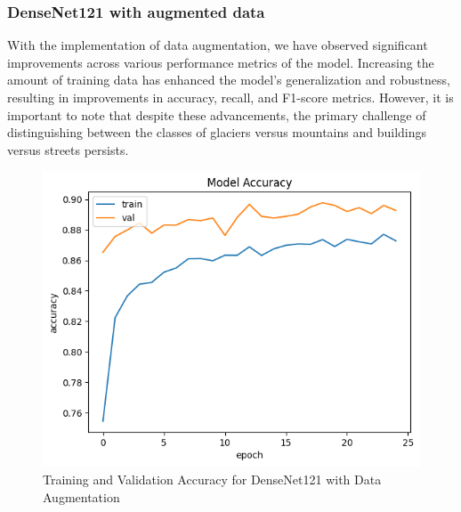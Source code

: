 \documentclass[conference]{IEEEtran}
\begin{document}
\subsubsection{DenseNet121 with augmented data}

With the implementation of data augmentation, we have observed significant improvements across various performance metrics of the model. Increasing the amount of training data has enhanced the model's generalization and robustness, resulting in improvements in accuracy, recall, and F1-score metrics. However, it is important to note that despite these advancements, the primary challenge of distinguishing between the classes of glaciers versus mountains and buildings versus streets persists. 

\begin{figure}[H]
    \centering
    \includegraphics[width=1\linewidth]{images//DenseNet/Tranning_Validation_Accuracy_Densenet_Data_Augmented.png}
    \caption{Training and Validation Accuracy for DenseNet121 with Data Augmentation}
    \label{fig:TV_Accuracy_DenseNet_DA}
\end{figure}
\end{document}
